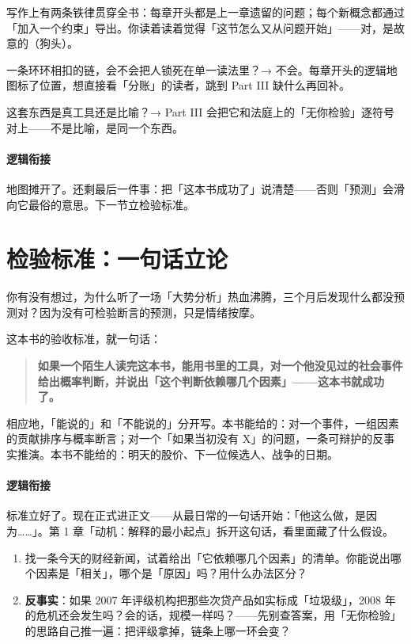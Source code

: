 \documentclass[../../main2.tex]{subfiles}
\begin{document}
写作上有两条铁律贯穿全书：每章开头都是上一章遗留的问题；每个新概念都通过「加入一个约束」导出。你读着读着觉得「这节怎么又从问题开始」——对，是故意的（狗头）。

\begin{reader_anticipation}
	\item 一条环环相扣的链，会不会把人锁死在单一读法里？→ 不会。每章开头的逻辑地图标了位置，想直接看「分账」的读者，跳到 Part III 缺什么再回补。
	\item 这套东西是真工具还是比喻？→ Part III 会把它和法庭上的「无你检验」逐符号对上——不是比喻，是同一个东西。
\end{reader_anticipation}

\paragraph*{逻辑衔接}
	地图摊开了。还剩最后一件事：把「这本书成功了」说清楚——否则「预测」会滑向它最俗的意思。下一节立检验标准。

\section{检验标准：一句话立论}

你有没有想过，为什么听了一场「大势分析」热血沸腾，三个月后发现什么都没预测对？因为没有可检验断言的预测，只是情绪按摩。

这本书的验收标准，就一句话：

\begin{quote}
	\textbf{如果一个陌生人读完这本书，能用书里的工具，对一个他没见过的社会事件给出概率判断，并说出「这个判断依赖哪几个因素」——这本书就成功了。}
\end{quote}

相应地，「能说的」和「不能说的」分开写。本书能给的：对一个事件，一组因素的贡献排序与概率断言；对一个「如果当初没有 X」的问题，一条可辩护的反事实推演。本书不能给的：明天的股价、下一位候选人、战争的日期。

\paragraph*{逻辑衔接}
	标准立好了。现在正式进正文——从最日常的一句话开始：「他这么做，是因为……」。第 1 章「动机：解释的最小起点」拆开这句话，看里面藏了什么假设。

\begin{thinkbox}
\begin{enumerate}
	\item 找一条今天的财经新闻，试着给出「它依赖哪几个因素」的清单。你能说出哪个因素是「相关」，哪个是「原因」吗？用什么办法区分？
	\item \textbf{反事实}：如果 2007 年评级机构把那些次贷产品如实标成「垃圾级」，2008 年的危机还会发生吗？会的话，规模一样吗？——先别查答案，用「无你检验」的思路自己推一遍：把评级拿掉，链条上哪一环会变？
\end{enumerate}
\end{thinkbox}
\end{document}

